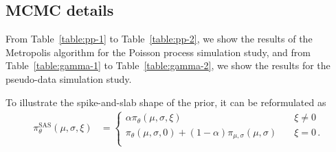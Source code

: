 
\subsection{MCMC details}
\label{section:mcmc-tables}
%
From Table~\ref{table:pp-1} to Table~\ref{table:pp-2},
we show the results of the Metropolis algorithm
for the Poisson process simulation study,
and from Table~\ref{table:gamma-1} to Table~\ref{table:gamma-2},
we show the results for the pseudo-data simulation study.
%
%




%
To illustrate the spike-and-slab shape of the prior, it can be reformulated as
%
\begin{align*}
	\pi_{\theta}^{\text{SAS}}(\mu, \sigma, \xi) &=
			\begin{cases}
			\alpha\pi_\theta(\mu, \sigma, \xi) & \quad \text{$\xi \neq 0 $} \\
			\pi_\theta(\mu, \sigma, 0) + (1 - \alpha)
				\pi_{\mu, \sigma}(\mu, \sigma) & \quad \text{$\xi = 0 $} \,. \\
		\end{cases}
\end{align*}
%